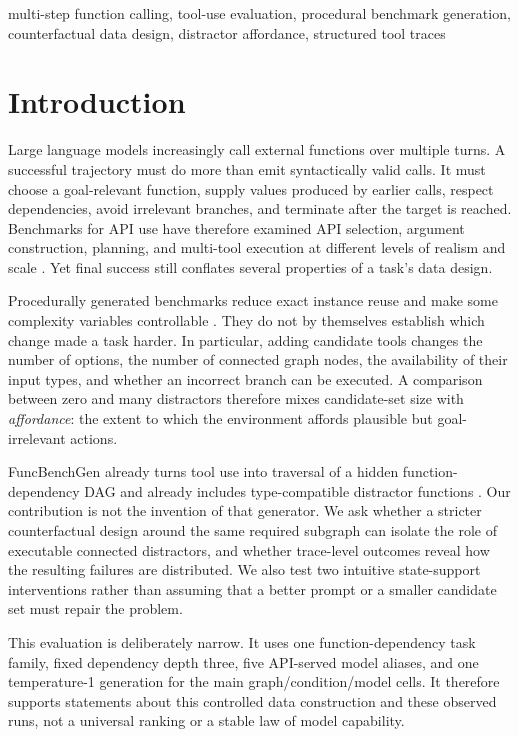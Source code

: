 \documentclass[twoside,11pt,preprint]{article}
\begin{document}
\begin{keywords}
multi-step function calling, tool-use evaluation, procedural benchmark
generation, counterfactual data design, distractor affordance, structured tool
traces
\end{keywords}

\section{Introduction}

Large language models increasingly call external functions over multiple turns.
A successful trajectory must do more than emit syntactically valid calls. It
must choose a goal-relevant function, supply values produced by earlier calls,
respect dependencies, avoid irrelevant branches, and terminate after the target
is reached. Benchmarks for API use have therefore examined API selection,
argument construction, planning, and multi-tool execution at different levels
of realism and scale \citep{li2023apibank,qin2023toolllm,patil2023gorilla,
shen2024taskbench}. Yet final success still conflates several properties of a
task's data design.

Procedurally generated benchmarks reduce exact instance reuse and make some
complexity variables controllable
\citep{srivastava2025beyondbench,li2025c2leva,chen2025dycodeeval}. They do not
by themselves establish which change made a task harder. In particular, adding
candidate tools changes the number of options, the number of connected graph
nodes, the availability of their input types, and whether an incorrect branch can
be executed. A comparison between zero and many distractors therefore mixes
candidate-set size with \emph{affordance}: the extent to which the environment
affords plausible but goal-irrelevant actions.

FuncBenchGen already turns tool use into traversal of a hidden
function-dependency DAG and already includes type-compatible distractor
functions \citep{maekawa2025funcbenchgen}. Our contribution is not the invention
of that generator. We ask whether a stricter counterfactual design around the
same required subgraph can isolate the role of executable connected distractors,
and whether trace-level outcomes reveal how the resulting failures are
distributed. We also test two intuitive state-support interventions rather than
assuming that a better prompt or a smaller candidate set must repair the
problem.

This evaluation is deliberately narrow. It uses one function-dependency task
family, fixed dependency depth three, five API-served model aliases, and one
temperature-1 generation for the main graph/condition/model cells. It therefore
supports statements about this controlled data construction and these observed
runs, not a universal ranking or a stable law of model capability.
\end{document}
